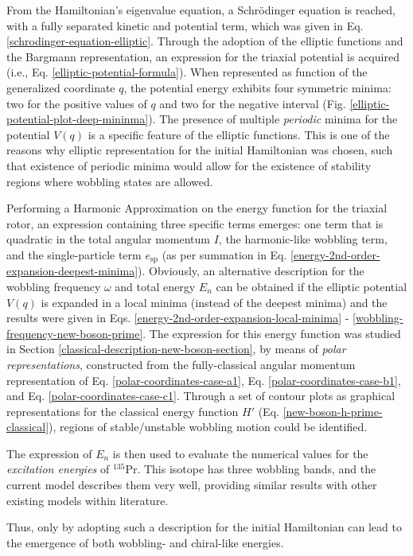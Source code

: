 From the Hamiltonian's eigenvalue equation, a Schrödinger equation is reached, with a fully separated kinetic and potential term, which was given in Eq. \ref{schrodinger-equation-elliptic}. Through the adoption of the elliptic functions and the Bargmann representation, an expression for the triaxial potential is acquired (i.e., Eq. \ref{elliptic-potential-formula}). When represented as function of the generalized coordinate $q$, the potential energy exhibits four symmetric minima: two for the positive values of $q$ and two for the negative interval (Fig. \ref{elliptic-potential-plot-deep-mininma}). The presence of multiple \emph{periodic} minima for the potential $V(q)$ is a specific feature of the elliptic functions. This is one of the reasons why elliptic representation for the initial Hamiltonian was chosen, such that existence of periodic minima would allow for the existence of stability regions where wobbling states are allowed.

Performing a Harmonic Approximation on the energy function for the triaxial rotor, an expression containing three specific terms emerges: one term that is quadratic in the total angular momentum $I$, the harmonic-like wobbling term, and the single-particle term $e_\text{sp}$ (as per summation in Eq. \ref{energy-2nd-order-expansion-deepest-minima}). Obviously, an alternative description for the wobbling frequency $\omega$ and total energy $E_n$ can be obtained if the elliptic potential $V(q)$ is expanded in a local minima (instead of the deepest minima) and the results were given in Eqs. \ref{energy-2nd-order-expansion-local-minima} - \ref{wobbling-frequency-new-boson-prime}. The expression for this energy function was studied in Section \ref{classical-description-new-boson-section}, by means of \emph{polar representations}, constructed from the fully-classical angular momentum representation of Eq. \ref{polar-coordinates-case-a1}, Eq. \ref{polar-coordinates-case-b1}, and Eq. \ref{polar-coordinates-case-c1}. Through a set of contour plots as graphical representations for the classical energy function $H'$ (Eq. \ref{new-boson-h-prime-classical}), regions of stable/unstable wobbling motion could be identified.

The expression of $E_n$ is then used to evaluate the numerical values for the \emph{excitation energies} of $^{135}$Pr. This isotope has three wobbling bands, and the current model describes them very well, providing similar results with other existing models within literature.

Thus, only by adopting such a description for the initial Hamiltonian can lead to the emergence of both wobbling- and chiral-like energies.

